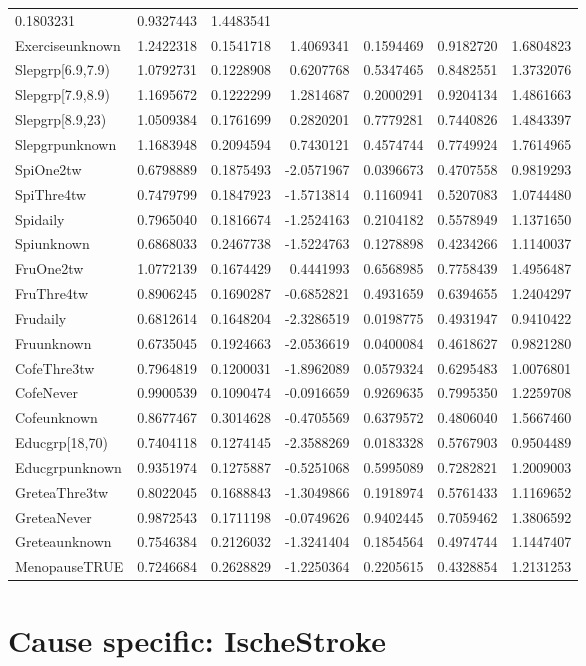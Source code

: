 \documentclass[]{article}
\begin{document}
\begin{longtable}[]{@{}lrrrrrr@{}}
0.1803231 & 0.9327443 & 1.4483541\tabularnewline
Exerciseunknown & 1.2422318 & 0.1541718 & 1.4069341 & 0.1594469 &
0.9182720 & 1.6804823\tabularnewline
Slepgrp{[}6.9,7.9) & 1.0792731 & 0.1228908 & 0.6207768 & 0.5347465 &
0.8482551 & 1.3732076\tabularnewline
Slepgrp{[}7.9,8.9) & 1.1695672 & 0.1222299 & 1.2814687 & 0.2000291 &
0.9204134 & 1.4861663\tabularnewline
Slepgrp{[}8.9,23) & 1.0509384 & 0.1761699 & 0.2820201 & 0.7779281 &
0.7440826 & 1.4843397\tabularnewline
Slepgrpunknown & 1.1683948 & 0.2094594 & 0.7430121 & 0.4574744 &
0.7749924 & 1.7614965\tabularnewline
SpiOne2tw & 0.6798889 & 0.1875493 & -2.0571967 & 0.0396673 & 0.4707558 &
0.9819293\tabularnewline
SpiThre4tw & 0.7479799 & 0.1847923 & -1.5713814 & 0.1160941 & 0.5207083
& 1.0744480\tabularnewline
Spidaily & 0.7965040 & 0.1816674 & -1.2524163 & 0.2104182 & 0.5578949 &
1.1371650\tabularnewline
Spiunknown & 0.6868033 & 0.2467738 & -1.5224763 & 0.1278898 & 0.4234266
& 1.1140037\tabularnewline
FruOne2tw & 1.0772139 & 0.1674429 & 0.4441993 & 0.6568985 & 0.7758439 &
1.4956487\tabularnewline
FruThre4tw & 0.8906245 & 0.1690287 & -0.6852821 & 0.4931659 & 0.6394655
& 1.2404297\tabularnewline
Frudaily & 0.6812614 & 0.1648204 & -2.3286519 & 0.0198775 & 0.4931947 &
0.9410422\tabularnewline
Fruunknown & 0.6735045 & 0.1924663 & -2.0536619 & 0.0400084 & 0.4618627
& 0.9821280\tabularnewline
CofeThre3tw & 0.7964819 & 0.1200031 & -1.8962089 & 0.0579324 & 0.6295483
& 1.0076801\tabularnewline
CofeNever & 0.9900539 & 0.1090474 & -0.0916659 & 0.9269635 & 0.7995350 &
1.2259708\tabularnewline
Cofeunknown & 0.8677467 & 0.3014628 & -0.4705569 & 0.6379572 & 0.4806040
& 1.5667460\tabularnewline
Educgrp{[}18,70) & 0.7404118 & 0.1274145 & -2.3588269 & 0.0183328 &
0.5767903 & 0.9504489\tabularnewline
Educgrpunknown & 0.9351974 & 0.1275887 & -0.5251068 & 0.5995089 &
0.7282821 & 1.2009003\tabularnewline
GreteaThre3tw & 0.8022045 & 0.1688843 & -1.3049866 & 0.1918974 &
0.5761433 & 1.1169652\tabularnewline
GreteaNever & 0.9872543 & 0.1711198 & -0.0749626 & 0.9402445 & 0.7059462
& 1.3806592\tabularnewline
Greteaunknown & 0.7546384 & 0.2126032 & -1.3241404 & 0.1854564 &
0.4974744 & 1.1447407\tabularnewline
MenopauseTRUE & 0.7246684 & 0.2628829 & -1.2250364 & 0.2205615 &
0.4328854 & 1.2131253\tabularnewline
\bottomrule
\end{longtable}

\hypertarget{cause-specific-ischestroke}{%
\section{Cause specific: IscheStroke}\label{cause-specific-ischestroke}}
\end{document}
